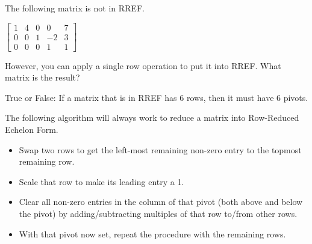 \edXsolution{  }

\endedxproblem




The following matrix is not in RREF.


$\left[ \begin{array}{ccccc} 1 & 4 & 0 & 0 & 7 \\
0 & 0 & 1 & -2 & 3 \\
0 & 0 & 0 & 1 & 1
 \end{array} \right]$

However, you can apply a single row operation to put it into RREF.  What matrix is the
result?  





\edXsolution{  }

\endedxproblem




True or False: If a matrix that is in RREF has 6 rows, then it must have 6 pivots.  



\edXsolution{  }

\endedxproblem

\endedxvertical








The following algorithm will always work to reduce a matrix into Row-Reduced Echelon Form.  

\begin{itemize}
\item Swap two rows to get the left-most remaining non-zero entry to the topmost remaining row.  
\item Scale that row to make its leading entry a 1.    
\item Clear all non-zero entries in the column of that pivot (both above and below the pivot) by adding/subtracting multiples of that row to/from other rows.  
\item With that pivot now set, repeat the procedure with the remaining rows.  
\end{itemize}

